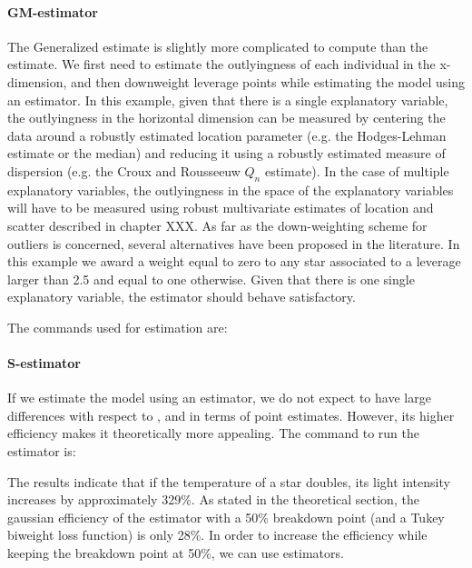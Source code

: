 \paragraph{GM-estimator}

The Generalized  estimate is slightly more complicated to compute than
the  estimate. We first need to estimate the outlyingness of each
individual in the x-dimension, and then downweight leverage points while
estimating the model using an  estimator. In this example, given that
there is a single explanatory variable, the outlyingness in the horizontal
dimension can be measured by centering the data around a robustly estimated
location parameter (e.g. the Hodges-Lehman estimate or the median) and reducing
it using a robustly estimated measure of dispersion (e.g. the Croux and
Rousseeuw $Q_{n}$ estimate). In the case of multiple explanatory variables, the
outlyingness in the space of the explanatory variables will have to be measured
using robust multivariate estimates of location and scatter described in
chapter \alert{XXX}. As far as the down-weighting scheme for outliers is
concerned, several alternatives have been proposed in the literature. In this
example we award a weight equal to zero to any star associated to a leverage
larger than 2.5 and equal to one otherwise. Given that there is one single
explanatory variable, the  estimator should behave satisfactory.

The commands used for  estimation are:                                 

\begin{stlog}

\end{stlog}


\paragraph{S-estimator}

If we estimate the model using an  estimator, we do not expect to have
large differences with respect to ,  and  in terms
of point estimates. However, its higher efficiency makes it theoretically more
appealing. The command to run the  estimator is:

\begin{stlog}

\end{stlog}

The results indicate that if the temperature of a star doubles, its light
intensity increases by approximately 329\%. As stated in the theoretical
section, the gaussian efficiency of the  estimator with a 50\%
breakdown point (and a Tukey biweight loss function) is only 28\%. In order to
increase the efficiency while keeping the breakdown point at 50\%, we can use
 estimators.


